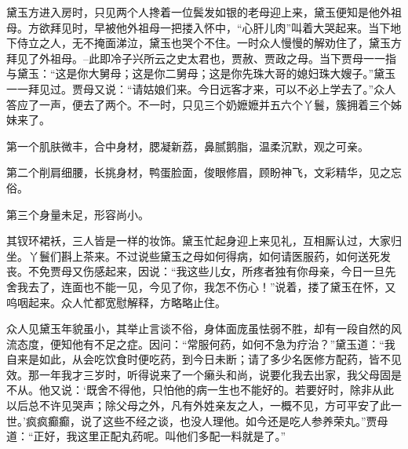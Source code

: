 \documentclass[12pt,oneside]{book}
\begin{document}
黛玉方进入房时，只见两个人搀着一位鬓发如银的老母迎上来，黛玉便知是他外祖母。方欲拜见时，早被他外祖母一把搂入怀中，“心肝儿肉”叫着大哭起来。当下地下侍立之人，无不掩面涕泣，黛玉也哭个不住。一时众人慢慢的解劝住了，黛玉方拜见了外祖母。--此即冷子兴所云之史太君也，贾赦、贾政之母。当下贾母一一指与黛玉：“这是你大舅母；这是你二舅母；这是你先珠大哥的媳妇珠大嫂子。”黛玉一一拜见过。贾母又说：“请姑娘们来。今日远客才来，可以不必上学去了。”众人答应了一声，便去了两个。不一时，只见三个奶嬷嬷并五六个丫鬟，簇拥着三个姊妹来了。

第一个肌肤微丰，合中身材，腮凝新荔，鼻腻鹅脂，温柔沉默，观之可亲。

第二个削肩细腰，长挑身材，鸭蛋脸面，俊眼修眉，顾盼神飞，文彩精华，见之忘俗。

第三个身量未足，形容尚小。

其钗环裙袄，三人皆是一样的妆饰。黛玉忙起身迎上来见礼，互相厮认过，大家归坐。丫鬟们斟上茶来。不过说些黛玉之母如何得病，如何请医服药，如何送死发丧。不免贾母又伤感起来，因说：“我这些儿女，所疼者独有你母亲，今日一旦先舍我去了，连面也不能一见，今见了你，我怎不伤心！”说着，搂了黛玉在怀，又呜咽起来。众人忙都宽慰解释，方略略止住。

众人见黛玉年貌虽小，其举止言谈不俗，身体面庞虽怯弱不胜，却有一段自然的风流态度，便知他有不足之症。因问：“常服何药，如何不急为疗治？”黛玉道：“我自来是如此，从会吃饮食时便吃药，到今日未断；请了多少名医修方配药，皆不见效。那一年我才三岁时，听得说来了一个癞头和尚，说要化我去出家，我父母固是不从。他又说：‘既舍不得他，只怕他的病一生也不能好的。若要好时，除非从此以后总不许见哭声；除父母之外，凡有外姓亲友之人，一概不见，方可平安了此一世。’疯疯癫癫，说了这些不经之谈，也没人理他。如今还是吃人参养荣丸。”贾母道：“正好，我这里正配丸药呢。叫他们多配一料就是了。”
\end{document}

